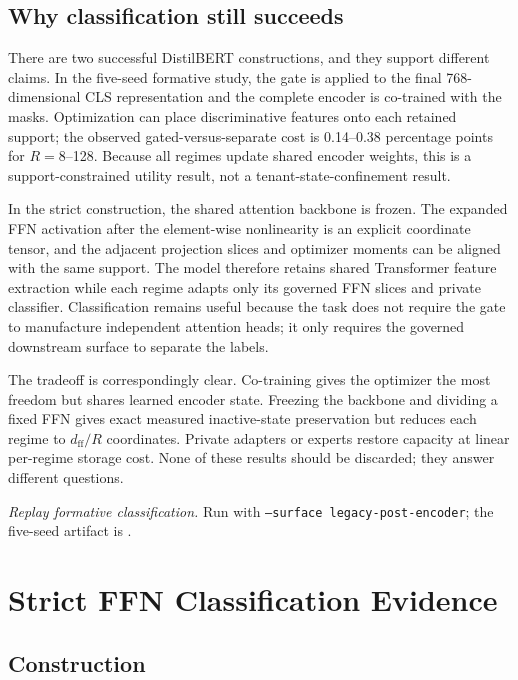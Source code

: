\documentclass[11pt]{article}
\begin{document}
\subsection{Why classification still succeeds}

There are two successful DistilBERT constructions, and they support different
claims. In the five-seed formative study, the gate is applied to the final
768-dimensional CLS representation and the complete encoder is co-trained with
the masks. Optimization can place discriminative features onto each retained
support; the observed gated-versus-separate cost is 0.14--0.38 percentage points
for $R=8$--128. Because all regimes update shared encoder weights, this is a
support-constrained utility result, not a tenant-state-confinement result.

In the strict construction, the shared attention backbone is frozen. The
expanded FFN activation after the element-wise nonlinearity is an explicit
coordinate tensor, and the adjacent projection slices and optimizer moments can
be aligned with the same support. The model therefore retains shared
Transformer feature extraction while each regime adapts only its governed FFN
slices and private classifier. Classification remains useful because the task
does not require the gate to manufacture independent attention heads; it only
requires the governed downstream surface to separate the labels.

The tradeoff is correspondingly clear. Co-training gives the optimizer the most
freedom but shares learned encoder state. Freezing the backbone and dividing a
fixed FFN gives exact measured inactive-state preservation but reduces each
regime to $d_{\mathrm{ff}}/R$ coordinates. Private adapters or experts restore
capacity at linear per-regime storage cost. None of these results should be
discarded; they answer different questions.

\noindent\textit{Replay formative classification.} Run
 with
\texttt{--surface legacy-post-encoder}; the five-seed artifact is
.

\section{Strict FFN Classification Evidence}

\subsection{Construction}
\end{document}
